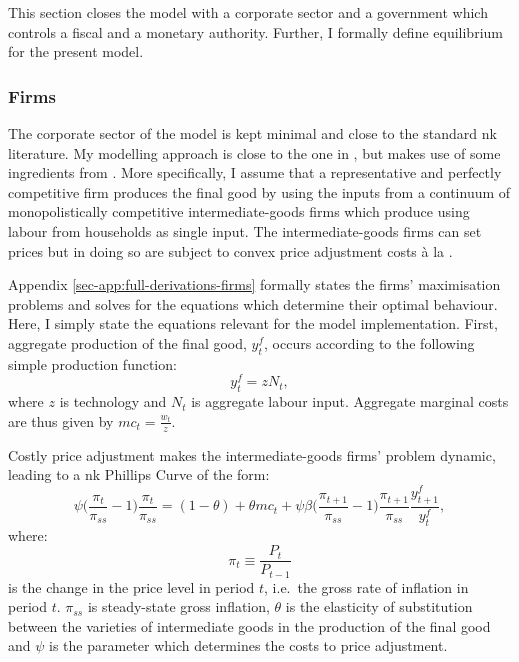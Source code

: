 \documentclass[12pt]{article} %
\numberwithin{equation}{section} %
\begin{document}
This section closes the model with a corporate sector and a government which controls a fiscal and a monetary authority. Further, I formally define equilibrium for the present model.

\subsubsection{Firms}
\label{sec:model-firms}

The corporate sector of the model is kept minimal and close to the standard \Gls{nk} literature. My modelling approach is close to the one in \textcite{mckay2016}, but makes use of some ingredients from \textcite{gust2017wp}. More specifically, I assume that a representative and perfectly competitive firm produces the final good by using the inputs from a continuum of monopolistically competitive intermediate-goods firms which produce using labour from households as single input. The intermediate-goods firms can set prices but in doing so are subject to convex price adjustment costs à la \textcite{rotemberg1982}. 

Appendix \ref{sec-app:full-derivations-firms} formally states the firms' maximisation problems and solves for the equations which determine their optimal behaviour. Here, I simply state the equations relevant for the model implementation. First, aggregate production of the final good, $y_t^f$, occurs according to the following simple production function:
\begin{equation}
    y_t^f = z N_t, \label{eq:firms-production}
\end{equation}
where $z$ is technology and $N_t$ is aggregate labour input. Aggregate marginal costs are thus given by $mc_t = \frac{w_t}{z}$. 

Costly price adjustment makes the intermediate-goods firms' problem dynamic, leading to a \Gls{nk} Phillips Curve of the form:
\begin{equation}
    \psi \Bigg( \frac{\pi_t}{\pi_{ss}} - 1 \Bigg) \frac{\pi_t}{\pi_{ss}} = (1-\theta) + \theta mc_t + \psi \beta \Bigg( \frac{\pi_{t+1}}{\pi_{ss}} - 1 \Bigg) \frac{\pi_{t+1}}{\pi_{ss}} \frac{y_{t+1}^f}{y_t^f}, \label{eq:firms-nkpc}
\end{equation}
where:
\begin{equation*}
    \pi_t \equiv \frac{P_t}{P_{t-1}} %
\end{equation*}
is the change in the price level in period $t$, i.e.~the gross rate of inflation in period $t$. $\pi_{ss}$ is steady-state gross inflation, $\theta$ is the elasticity of substitution between the varieties of intermediate goods in the production of the final good and $\psi$ is the parameter which determines the costs to price adjustment. 
\end{document}
